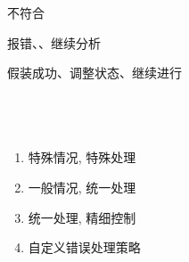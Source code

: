 \begin{frame}{}
  \begin{center}
    \texttt{\bf {}}

    \vspace{0.50cm}

    \vspace{0.30cm}
    不符合
  \end{center}
\end{frame}

\begin{frame}{}
\end{frame}

\begin{frame}{}
  \begin{center}

    \vspace{0.20cm}
    报错、、继续分析
  \end{center}
\end{frame}

\begin{frame}{}

  \vspace{0.30cm}
  \begin{center}
     假装成功、调整状态、继续进行
  \end{center}
\end{frame}

\begin{frame}
  \begin{center}
     \\[10pt]
  \end{center}

  \begin{columns}
      \begin{enumerate}[(1)]
        \setlength{\itemsep}{10pt}
        \item 特殊情况, 特殊处理
        \item 一般情况, 统一处理
        \item 统一处理, 精细控制
        \item 自定义错误处理策略
      \end{enumerate}
  \end{columns}
\end{frame}

